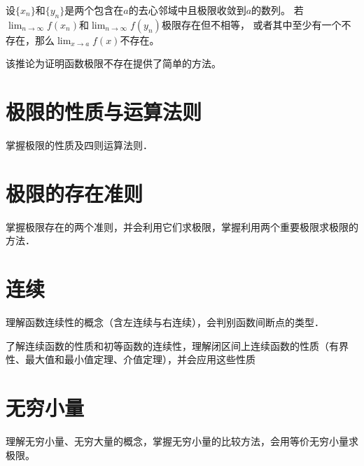 \begin{corollary}
  设$\{x_n\}$和$\{y_n\}$是两个包含在$a$的去心邻域中且极限收敛到$a$的数列。
  若$\lim_{n\to\infty}f(x_n)$和$\lim_{n\to\infty}f(y_n)$极限存在但不相等，
  或者其中至少有一个不存在，那么$\lim_{x\to a}f(x)$不存在。
\end{corollary}
\begin{remark}
  该推论为证明函数极限不存在提供了简单的方法。
\end{remark}

\section{极限的性质与运算法则}
掌握极限的性质及四则运算法则．

\section{极限的存在准则}
掌握极限存在的两个准则，并会利用它们求极限，掌握利用两个重要极限求极限的方法．

\section{连续}
理解函数连续性的概念（含左连续与右连续），会判别函数间断点的类型．

了解连续函数的性质和初等函数的连续性，理解闭区间上连续函数的性质（有界性、最大值和最小值定理、介值定理），并会应用这些性质

\section{无穷小量}
理解无穷小量、无穷大量的概念，掌握无穷小量的比较方法，会用等价无穷小量求极限。
